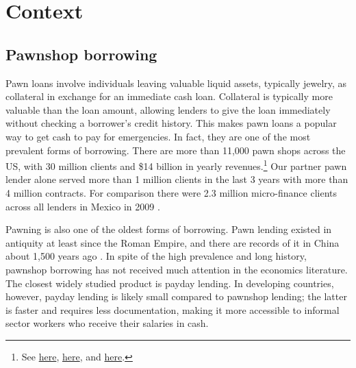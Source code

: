 \documentclass[11pt, a4paper]{article}
\begin{document}
\section{Context} \label{context}

\subsection{Pawnshop borrowing}
    
Pawn loans involve individuals leaving valuable liquid assets, typically jewelry, as collateral in exchange for an immediate cash loan. Collateral is typically more valuable than the loan amount, allowing lenders to give the loan immediately without checking a borrower's credit history. This makes pawn loans a popular way to get cash to pay for emergencies. In fact, they are one of the most prevalent forms of borrowing. There are more than 11,000 pawn shops across the US, with 30 million clients and \$14 billion in yearly revenues.\footnote{See
\href{https://tinyurl.com/ybm56dpe}{here}, \href{https://tinyurl.com/y9zdcgws}{here}, and \href{https://tinyurl.com/y59ptdam}{here}.}
Our partner pawn lender alone served more than 1 million clients in the last 3 years with more than 4 million contracts. For comparison there were 2.3 million micro-finance clients across all lenders in Mexico in 2009 \citep{Pedroza:2010}. 

Pawning is also one of the oldest forms of borrowing. Pawn lending existed in antiquity at least since the Roman Empire, and there are records of it in China about 1,500 years ago \citep{PawnShops}. In spite of the high prevalence and long history, pawnshop borrowing has not received much attention in the economics literature. The closest widely studied product is payday lending. In developing countries, however, payday lending is likely small compared to pawnshop lending; the latter is faster and requires less documentation, making it more accessible to informal sector workers who receive their salaries in cash. %

\end{document}
